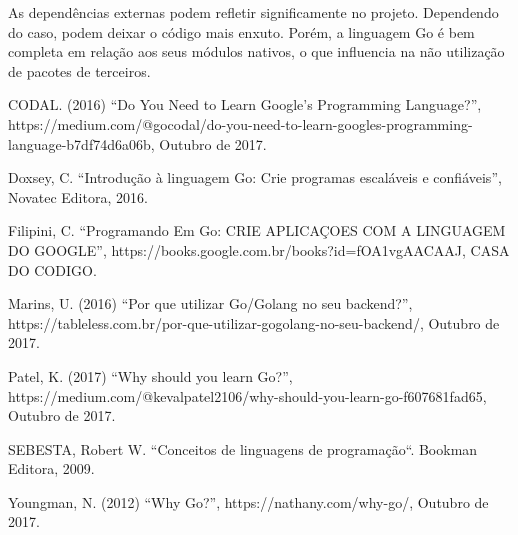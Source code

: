 \documentclass{SBCbookchapter}
\begin{document}
As dependências externas podem refletir significamente no projeto. Dependendo do caso, podem deixar o código mais enxuto. Porém, a linguagem Go é bem completa em relação aos seus módulos nativos, o que influencia na não utilização de pacotes de terceiros.

\begin{thebibliography}{99}
	
 CODAL. (2016) ``Do You Need to Learn Google’s Programming Language?'', https://medium.com/@gocodal/do-you-need-to-learn-googles-programming-language-b7df74d6a06b, Outubro de 2017.

 Doxsey, C. ``Introdução à linguagem Go: Crie programas escaláveis e confiáveis'', Novatec Editora, 2016.
	
 Filipini, C. ``Programando Em Go: CRIE APLICAÇOES COM A 	LINGUAGEM DO GOOGLE'', https://books.google.com.br/books?id=fOA1vgAACAAJ,
	CASA DO CODIGO.	
	
 Marins, U. (2016) ``Por que utilizar Go/Golang no seu backend?'',
https://tableless.com.br/por-que-utilizar-gogolang-no-seu-backend/, Outubro de 2017.

 Patel, K. (2017) ``Why should you learn Go?'',
https://medium.com/@kevalpatel2106/why-should-you-learn-go-f607681fad65, Outubro de 2017.

 SEBESTA, Robert W. ``Conceitos de linguagens de programação``. Bookman Editora, 2009.

 Youngman, N. (2012) ``Why Go?'',
https://nathany.com/why-go/, Outubro de 2017.

\end{thebibliography}
\end{document}
